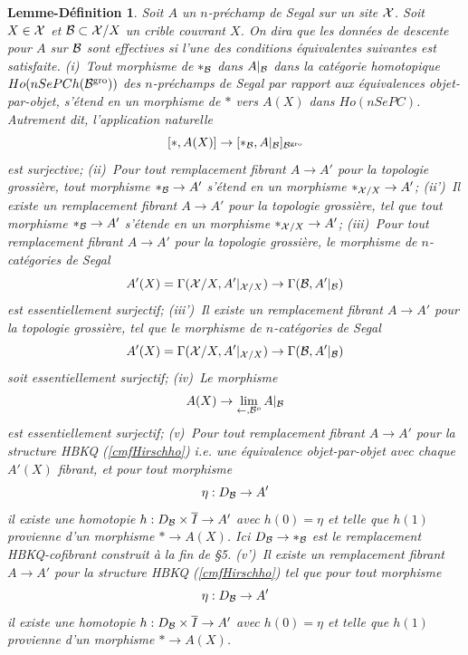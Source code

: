 \documentclass[12pt]{article}
\newtheorem{lemmedefinition}[lemma]{Lemme-D\'efinition}
\newcommand{\Bb}{{\cal B}}
\newcommand{\Xx}{{\cal X}}
\begin{document}
\begin{lemmedefinition}
\label{lemmedef}
Soit $A$ un $n$-pr\'echamp de Segal sur un site $\Xx$. Soit $X\in \Xx$ et
$\Bb \subset \Xx /X$ un crible couvrant $X$. On dira que {\em les donn\'ees
de descente pour $A$ sur $\Bb$ sont effectives} si l'une des
conditions \'equivalentes suivantes est satisfaite.
\newline
(i)\,  Tout morphisme de $\ast _{\Bb}$ dans $A|_{\Bb}$ dans la cat\'egorie
homotopique  $Ho(nSePCh(\Bb ^{\rm gro}))$ des $n$-pr\'echamps de Segal par
rapport
aux \'equivalences objet-par-objet, s'\'etend en un morphisme de $\ast$ vers
$A(X)$ dans $Ho(nSePC)$. Autrement dit, l'application naturelle
$$
[\ast , A(X)]\rightarrow [\ast _{\Bb} , A|_{\Bb}]_{\Bb ^{\rm gro}}
$$
est surjective;
\newline
(ii)\, Pour tout remplacement fibrant $A\rightarrow A'$ pour la topologie
grossi\`ere, tout morphisme $\ast _{\Bb}\rightarrow A'$ s'\'etend en un
morphisme $\ast _{\Xx /X}\rightarrow A'$;
\newline
(ii')\, Il existe un remplacement fibrant $A\rightarrow A'$ pour la topologie
grossi\`ere, tel que tout morphisme $\ast _{\Bb}\rightarrow A'$ s'\'etende en un
morphisme $\ast _{\Xx /X}\rightarrow A'$;
\newline
(iii)\, Pour tout remplacement fibrant $A\rightarrow A'$ pour la topologie
grossi\`ere, le morphisme de $n$-cat\'egories de Segal
$$
A'(X)=\Gamma (\Xx /X , A'|_{\Xx /X})\rightarrow \Gamma (\Bb , A'|_{\Bb})
$$
est essentiellement surjectif;
\newline
(iii')\, Il existe un remplacement fibrant $A\rightarrow A'$ pour la topologie
grossi\`ere, tel que le morphisme de $n$-cat\'egories de Segal
$$
A'(X)=\Gamma (\Xx /X , A'|_{\Xx /X})\rightarrow \Gamma (\Bb , A'|_{\Bb})
$$
soit essentiellement surjectif;
\newline
(iv)\, Le morphisme
$$
A(X)\rightarrow \lim _{\leftarrow , \Bb ^o} A|_{\Bb }
$$
est essentiellement surjectif;
\newline
(v)\, Pour tout remplacement fibrant $A\rightarrow A'$ pour la structure
HBKQ (\ref{cmfHirschho})
i.e. une \'equivalence objet-par-objet avec chaque $A'(X)$
fibrant, et pour tout morphisme
$$
\eta : D_{\Bb}\rightarrow A'
$$
il existe une homotopie $h: D_{\Bb}\times \overline{I}\rightarrow A'$
avec $h(0)=\eta$ et telle que $h(1)$ provienne d'un morphisme $\ast\rightarrow
A(X)$. Ici $D_{\Bb}\rightarrow \ast _{\Bb}$ est le remplacement HBKQ-cofibrant
construit \`a la fin de \S 5.
\newline
(v')\, Il existe un remplacement fibrant $A\rightarrow A'$ pour la
structure HBKQ
(\ref{cmfHirschho}) tel que pour tout morphisme
$$
\eta : D_{\Bb}\rightarrow A'
$$
il existe une homotopie $h: D_{\Bb}\times \overline{I}\rightarrow A'$
avec $h(0)=\eta$ et telle que $h(1)$ provienne d'un morphisme $\ast\rightarrow
A(X)$.


\end{lemmedefinition}
\end{document}
